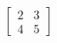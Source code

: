 \documentclass[preview]{standalone}
\begin{document}
\begin{align*}
\begin{bmatrix} 2 & 3 \\ 4 & 5 \end{bmatrix}
\end{align*}
\end{document}
